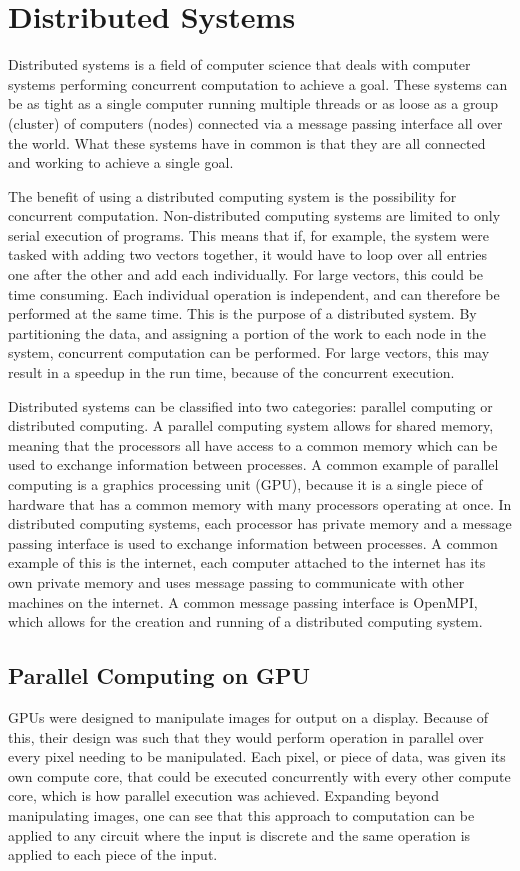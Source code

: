 \section{Distributed Systems}
Distributed systems is a field of computer science that deals with computer systems performing concurrent computation to achieve a goal. These systems can be as tight as a single computer running multiple threads or as loose as a group (cluster) of computers (nodes) connected via a message passing interface all over the world. What these systems have in common is that they are all connected and working to achieve a single goal.

The benefit of using a distributed computing system is the possibility for concurrent computation. Non-distributed computing systems are limited to only serial execution of programs. This means that if, for example, the system were tasked with adding two vectors together, it would have to loop over all entries one after the other and add each individually. For large vectors, this could be time consuming. Each individual operation is independent, and can therefore be performed at the same time. This is the purpose of a distributed system. By partitioning the data, and assigning a portion of the work to each node in the system, concurrent computation can be performed. For large vectors, this may result in a speedup in the run time, because of the concurrent execution.

Distributed systems can be classified into two categories: parallel computing or distributed computing. A parallel computing system allows for shared memory, meaning that the processors all have access to a common memory which can be used to exchange information between processes. A common example of parallel computing is a graphics processing unit (GPU), because it is a single piece of hardware that has a common memory with many processors operating at once. In distributed computing systems, each processor has private memory and a message passing interface is used to exchange information between processes. A common example of this is the internet, each computer attached to the internet has its own private memory and uses message passing to communicate with other machines on the internet. A common message passing interface is OpenMPI, which allows for the creation and running of a distributed computing system.

\subsection{Parallel Computing on GPU}
GPUs were designed to manipulate images for output on a display. Because of this, their design was such that they would perform operation in parallel over every pixel needing to be manipulated. Each pixel, or piece of data, was given its own compute core, that could be executed concurrently with every other compute core, which is how parallel execution was achieved. Expanding beyond manipulating images, one can see that this approach to computation can be applied to any circuit where the input is discrete and the same operation is applied to each piece of the input. 

